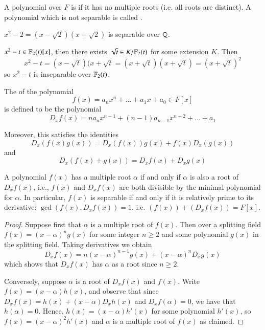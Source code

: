 \begin{definition}
    A polynomial over $F$ is  if it has no multiple roots (i.e. all roots are distinct). A polynomial which is not separable is called .
\end{definition}

\begin{example}
    $x^2-2 = (x-\sqrt{2})(x+\sqrt{2})$ is separable over $\mathbb Q$.
\end{example}

\begin{example}
    $x^2 - t \in \mathbb F_2(t)[x]$, then there exists $\sqrt{t} \in K/\mathbb F_2(t)$ for some extension $K$. Then $$x^2-t = (x-\sqrt{t})(x+\sqrt{t} = (x+\sqrt{t})(x+\sqrt{t}) = (x+\sqrt{t})^2$$ so $x^2-t$ is inseparable over $\mathbb F_2(t)$.
\end{example}


\begin{definition}
    The  of the polynomial \begin{equation*}
        f(x) = a_nx^n+...+a_1x+a_0 \in F[x]
    \end{equation*}
    is defined to be the polynomial \begin{equation*}
        D_xf(x) = na_nx^{n-1}+(n-1)a_{n-1}x^{n-2}+...+a_1
    \end{equation*}
\end{definition}


Moreover, this satisfies the identities \begin{equation*}
    D_x(f(x)g(x)) = D_x(f(x))g(x)+f(x)D_x(g(x))
\end{equation*}
and \begin{equation*}
    D_x(f(x)+g(x)) = D_xf(x)+D_xg(x)
\end{equation*}


\begin{proposition}\label{prop:seprel}
    A polynomial $f(x)$ has a multiple root $\alpha$ if and only if $\alpha$ is also a root of $D_xf(x)$, i.e., $f(x)$ and $D_xf(x)$ are both divisible by the minimal polynomial for $\alpha$. In particular, $f(x)$ is separable if and only if it is relatively prime to its derivative: $\gcd(f(x),D_xf(x)) = 1$, i.e. $(f(x))+(D_xf(x)) = F[x]$.
\end{proposition}
\begin{proof}
    Suppose first that $\alpha$ is a multiple root of $f(x)$. Then over a splitting field $f(x) = (x-\alpha)^ng(x)$ for some integer $n \geq 2$ and some polynomial $g(x)$ in the splitting field. Taking derivatives we obtain \begin{equation*}
        D_xf(x) = n(x-\alpha)^{n-1}g(x) + (x-\alpha)^nD_xg(x)
    \end{equation*}
    which shows that $D_xf(x)$ has $\alpha$ as a root since $n \geq 2$.

    Conversely, suppose $\alpha$ is a root of $D_xf(x)$ and $f(x)$. Write $f(x) = (x-\alpha)h(x)$, and observe that since $D_xf(x) = h(x) + (x-\alpha)D_xh(x)$ and $D_xf(\alpha) = 0$, we have that $h(\alpha) = 0$. Hence, $h(x) = (x-\alpha)h'(x)$ for some polynomial $h'(x)$, so $f(x) = (x-\alpha)^2h'(x)$ and $\alpha$ is a multiple root of $f(x)$ as claimed.
\end{proof}

